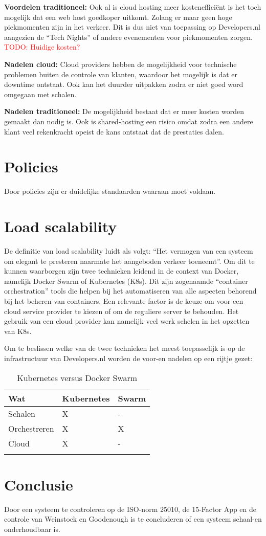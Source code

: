 \textbf{Voordelen traditioneel:} Ook al is cloud hosting meer kostenefficiënt is het toch mogelijk dat een web host goedkoper uitkomt. Zolang er maar geen hoge piekmomenten zijn in het verkeer. Dit is dus niet van toepassing op Developers.nl aangezien de \enquote{Tech Nights} of andere evenementen voor piekmomenten zorgen. \textcolor{red}{TODO: Huidige kosten?} %

\textbf{Nadelen cloud:} Cloud providers hebben de mogelijkheid voor technische problemen buiten de controle van klanten, waardoor het mogelijk is dat er downtime ontstaat. Ook kan het duurder uitpakken zodra er niet goed word omgegaan met schalen.

\textbf{Nadelen traditioneel:} De mogelijkheid bestaat dat er meer kosten worden gemaakt dan nodig is. Ook is shared-hosting een risico omdat zodra een andere klant veel rekenkracht opeist de kans ontstaat dat de prestaties dalen.

\section{Policies}
Door policies zijn er duidelijke standaarden waaraan moet voldaan.

\section{Load scalability}

De definitie van load scalability luidt als volgt: \enquote{Het vermogen van een systeem om elegant te presteren naarmate het aangeboden verkeer toeneemt}. Om dit te kunnen waarborgen zijn twee technieken leidend in de context van Docker, namelijk Docker Swarm of Kubernetes (K8s). Dit zijn zogenaamde \enquote{container orchestration} tools die helpen bij het automatiseren van alle aspecten behorend bij het beheren van containers. Een relevante factor is de keuze om voor een cloud service provider te kiezen of om de reguliere server te behouden. Het gebruik van een cloud provider kan namelijk veel werk schelen in het opzetten van K8s.

Om te beslissen welke van de twee technieken het meest toepasselijk is op de infrastructuur van Developers.nl worden de voor-en nadelen op een rijtje gezet:

\begin{table}[h]
	\caption{Kubernetes versus Docker Swarm}
	\label{tab:LoadScalability}
	\centering
	\begin{tabular}{p{2cm} p{3.5cm} p{3.5cm}}
		\toprule
		\textbf{Wat} & \textbf{Kubernetes} & \textbf{Swarm} \\
		\midrule
		Schalen & X & - \\
		Orchestreren & X & X \\
		Cloud & X & - \\
		\bottomrule\\
	\end{tabular}
\end{table}



\section{Conclusie}

Door een systeem te controleren op de ISO-norm 25010, de 15-Factor App en de controle van Weinstock en Goodenough is te concluderen of een systeem schaal-en onderhoudbaar is.